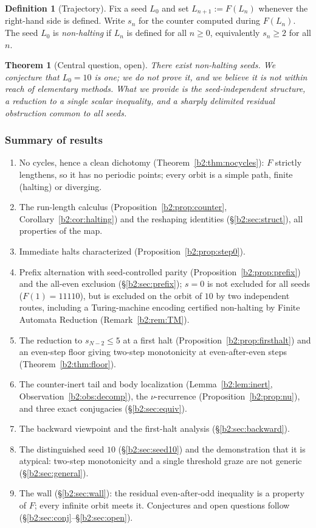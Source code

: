 \documentclass[a4paper]{article}
\theoremstyle{plain}
\newtheorem{thm}[theorem]{Theorem}
\theoremstyle{definition}
\newtheorem{definition}{Definition}[subsection]
\theoremstyle{remark}
\begin{document}
\begin{definition}[Trajectory]\label{b2:def:traj}
Fix a seed $L_0$ and set $L_{n+1}:=F(L_n)$ whenever the right-hand side is defined. Write $s_n$ for the counter computed during $F(L_n)$. The seed $L_0$ is \emph{non-halting} if $L_n$ is defined for all $n\ge 0$, equivalently $s_n\ge 2$ for all $n$.
\end{definition}

\begin{thm}[Central question, open]\label{b2:thm:central}
There exist non-halting seeds. We conjecture that $L_0=10$ is one; we do not prove it, and we believe it is not within reach of elementary methods. What we provide is the seed-independent structure, a reduction to a single scalar inequality, and a sharply delimited residual obstruction common to all seeds.
\end{thm}

\subsubsection{Summary of results}
\begin{enumerate}[label=(\roman*)]
\item No cycles, hence a clean dichotomy (Theorem~\ref{b2:thm:nocycles}): $F$ strictly lengthens, so it has no periodic points; every orbit is a simple path, finite (halting) or diverging.
\item The run-length calculus (Proposition~\ref{b2:prop:counter}, Corollary~\ref{b2:cor:halting}) and the reshaping identities (\S\ref{b2:sec:struct}), all properties of the map.
\item Immediate halts characterized (Proposition~\ref{b2:prop:step0}).
\item Prefix alternation with seed-controlled parity (Proposition~\ref{b2:prop:prefix}) and the all-even exclusion (\S\ref{b2:sec:prefix}); $s=0$ is not excluded for all seeds ($F(1)=11110$), but is excluded on the orbit of $10$ by two independent routes, including a Turing-machine encoding certified non-halting by Finite Automata Reduction (Remark~\ref{b2:rem:TM}).
\item The reduction to $s_{N-2}\le 5$ at a first halt (Proposition~\ref{b2:prop:firsthalt}) and an even-step floor giving two-step monotonicity at even-after-even steps (Theorem~\ref{b2:thm:floor}).
\item The counter-inert tail and body localization (Lemma~\ref{b2:lem:inert}, Observation~\ref{b2:obs:decomp}), the $\nu$-recurrence (Proposition~\ref{b2:prop:nu}), and three exact conjugacies (\S\ref{b2:sec:equiv}).
\item The backward viewpoint and the first-halt analysis (\S\ref{b2:sec:backward}).
\item The distinguished seed $10$ (\S\ref{b2:sec:seed10}) and the demonstration that it is atypical: two-step monotonicity and a single threshold graze are not generic (\S\ref{b2:sec:general}).
\item The wall (\S\ref{b2:sec:wall}): the residual even-after-odd inequality is a property of $F$; every infinite orbit meets it. Conjectures and open questions follow (\S\ref{b2:sec:conj}--\S\ref{b2:sec:open}).
\end{enumerate}
\end{document}
